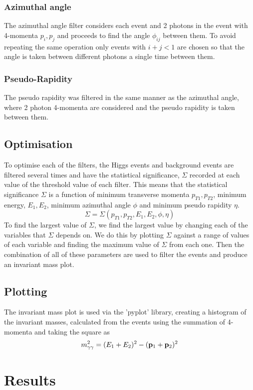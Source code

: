 \documentclass{article}
\begin{document}
\subsubsection{Azimuthal angle}
The azimuthal angle filter considers each event and 2 photons in the event with 4-momenta $p_i, p_j$ and proceeds to find the angle $\phi_{ij}$ between them. To avoid repeating the same operation only events with $i+j<1$ are chosen so that the angle is taken between different photons a single time between them.
\subsubsection{Pseudo-Rapidity}
The pseudo rapidity was filtered in the same manner as the azimuthal angle, where 2 photon 4-momenta are considered and the pseudo rapidity is taken between them.
\subsection{Optimisation}
To optimise each of the filters, the Higgs events and background events are filtered several times and have the statistical significance, $\Sigma$ recorded at each value of the threshold value of each filter. This means that the statistical significance $\Sigma$ is a function of minimum transverse momenta $p_{T1}, p_{T2}$, minimum energy, $E_1, E_2$, minimum azimuthal angle $\phi$ and minimum pseudo rapidity $\eta$.
\begin{equation}
\Sigma = \Sigma(p_{T1}, p_{T2}, E_1, E_2, \phi, \eta)
\end{equation}
To find the largest value of $\Sigma$, we find the largest value by changing each of the variables that $\Sigma$ depends on. We do this by plotting $\Sigma$ against a range of values of each variable and finding the maximum value of $\Sigma$ from each one. Then the combination of all of these parameters are used to filter the events and produce an invariant mass plot.
\subsection{Plotting}
The invariant mass plot is used via the 'pyplot' library, creating a histogram of the invariant masses, calculated from the events using the summation of 4-momenta and taking the square as
\begin{equation}
m_{\gamma \gamma}^2 = (E_1 + E_2)^2 - ({\bf p}_1  + {\bf p}_2)^2
\end{equation}
\section{Results}
\end{document}
